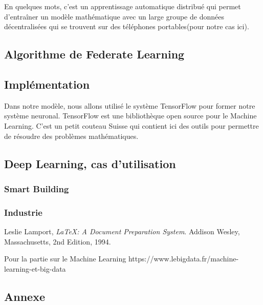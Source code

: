 \documentclass[12pt,a4paper]{report}
\begin{document}
En quelques mots, c'est un apprentissage automatique distribué qui permet d'entraîner un modèle mathématique avec un large groupe de données décentralisées qui se trouvent sur des téléphones portables(pour notre cas ici).


\section{Algorithme de Federate Learning}


\section{Implémentation}
Dans notre modèle, nous allons utilisé le système TensorFlow pour former notre système neuronal. TensorFlow est une bibliothèque open source pour le Machine Learning. C'est un petit couteau Suisse qui contient ici des outils pour permettre de résoudre des problèmes mathématiques. 

\section{Deep Learning, cas d'utilisation}

\subsection{Smart Building}

\subsection{Industrie}




\begin{thebibliography}{9}

	  Leslie Lamport,
	  \emph{\LaTeX: A Document Preparation System}.
	  Addison Wesley, Massachusetts,
	  2nd Edition,
	  1994.
	  
	Pour la partie sur le Machine Learning https://www.lebigdata.fr/machine-learning-et-big-data

\end{thebibliography}


\label{Pour la partie sur le Machine Learning https://www.lebigdata.fr/machine-learning-et-big-data}

\label{TensorFlow : https://www.lebigdata.fr/tensorflow-definition-tout-savoir}



\label{https://www.youtube.com/watch?v=QR1SnCRungE&ab_channel=AlainOlivetti} 


\begin{appendix}
 \chapter{Annexe}
 
\end{appendix}
\end{document}
